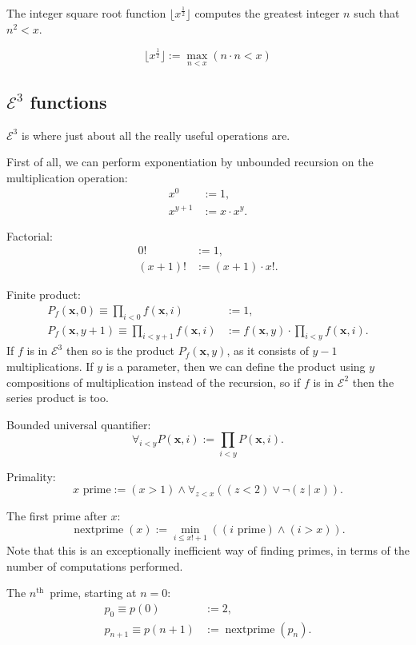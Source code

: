 \documentclass[a4paper]{article}
\newcommand{\grz}[1]{$\mathcal{E}^{#1}$}	%
\newcommand{\nth}{$n^{\textrm{th}}$~}	%
\newcommand{\xvec}{\mathbf{x}}	%
\newcommand{\recur}[1]{\begin{equation} \begin{split} #1 \end{split} \end{equation}}	%
\theoremstyle{plain}
\theoremstyle{definition}
\begin{document}
The integer square root function $\lfloor x^{\frac{1}{2}} \rfloor$ computes the greatest integer $n$ such that $n^2 < x$.

\[ \lfloor x^{\frac{1}{2}} \rfloor := \max_{n < x}{\left ( n \cdot n < x \right )} \]

\subsection{\grz{3} functions}
\grz{3} is where just about all the really useful operations are.

First of all, we can perform exponentiation by unbounded recursion on the multiplication operation:
\recur{
	x^0 &:= 1,				\\
	x^{y+1} &:= x \cdot x^y.
}

Factorial:
\recur{
	0! &:= 1,	\\
	(x+1)! &:= (x+1) \cdot x!.
}

Finite product:
\recur{
	P_f(\xvec,0) \equiv \prod_{i < 0} f(\xvec,i) &:= 1,	\\
	P_f(\xvec,y+1) \equiv \prod_{i < y+1} f(\xvec,i) &:= f(\xvec,y) \cdot \prod_{i < y} f(\xvec, i).
}
If $f$ is in \grz{3} then so is the product $P_f(\xvec,y)$, as it consists of $y-1$ multiplications. If $y$ is a parameter, then we can define the product using $y$ compositions of multiplication instead of the recursion, so if $f$ is in \grz{2} then the series product is too.

Bounded universal quantifier:
\begin{equation} \forall_{i < y} P(\xvec,i) := \prod_{i < y} P(\xvec,i). \end{equation}

Primality:
\begin{equation} x \textrm{ prime} :=  (x > 1) \wedge \forall_{z < x} \left( (z < 2) \vee \neg (z \mid x) \right). \end{equation}

The first prime after $x$:
\begin{equation} \operatorname{nextprime}(x) := \min_{i \leq x!+1} \left( (i \textrm{ prime}) \wedge (i > x) \right). \end{equation}
Note that this is an exceptionally inefficient way of finding primes, in terms of the number of computations performed. 

The \nth prime, starting at $n=0$:
\recur{
	p_0 \equiv p(0) &:= 2,		\\
	p_{n+1} \equiv p(n+1) &:= \operatorname{nextprime} (p_n).
}
\end{document}
